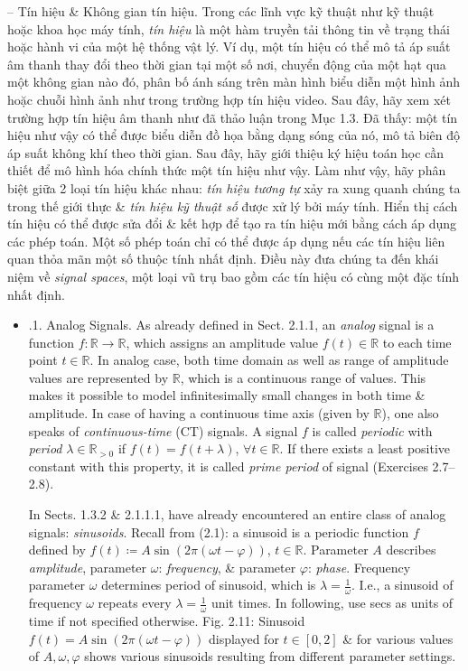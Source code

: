 \documentclass{article}
\begin{document}
\begin{itemize}
\begin{itemize}
		-- {\sf Tín hiệu \& Không gian tín hiệu.} Trong các lĩnh vực kỹ thuật như kỹ thuật hoặc khoa học máy tính, {\it tín hiệu} là một hàm truyền tải thông tin về trạng thái hoặc hành vi của một hệ thống vật lý. Ví dụ, một tín hiệu có thể mô tả áp suất âm thanh thay đổi theo thời gian tại một số nơi, chuyển động của một hạt qua một không gian nào đó, phân bố ánh sáng trên màn hình biểu diễn một hình ảnh hoặc chuỗi hình ảnh như trong trường hợp tín hiệu video. Sau đây, hãy xem xét trường hợp tín hiệu âm thanh như đã thảo luận trong Mục 1.3. Đã thấy: một tín hiệu như vậy có thể được biểu diễn đồ họa bằng dạng sóng của nó, mô tả biên độ áp suất không khí theo thời gian. Sau đây, hãy giới thiệu ký hiệu toán học cần thiết để mô hình hóa chính thức một tín hiệu như vậy. Làm như vậy, hãy phân biệt giữa 2 loại tín hiệu khác nhau: {\it tín hiệu tương tự} xảy ra xung quanh chúng ta trong thế giới thực \& {\it tín hiệu kỹ thuật số} được xử lý bởi máy tính. Hiển thị cách tín hiệu có thể được sửa đổi \& kết hợp để tạo ra tín hiệu mới bằng cách áp dụng các phép toán. Một số phép toán chỉ có thể được áp dụng nếu các tín hiệu liên quan thỏa mãn một số thuộc tính nhất định. Điều này đưa chúng ta đến khái niệm về {\it signal spaces}, một loại vũ trụ bao gồm các tín hiệu có cùng một đặc tính nhất định.
		\begin{itemize}
			\item {.1. Analog Signals.} As already defined in Sect. 2.1.1, an {\it analog} signal is a function $f:\mathbb{R}\to\mathbb{R}$, which assigns an amplitude value $f(t)\in\mathbb{R}$ to each time point $t\in\mathbb{R}$. In analog case, both time domain as well as range of amplitude values are represented by $\mathbb{R}$, which is a continuous range of values. This makes it possible to model infinitesimally small changes in both time \& amplitude. In case of having a continuous time axis (given by $\mathbb{R}$), one also speaks of {\it continuous-time} (CT) signals. A signal $f$ is called {\it periodic} with {\it period} $\lambda\in\mathbb{R}_{> 0}$ if $f(t) = f(t + \lambda)$, $\forall t\in\mathbb{R}$. If there exists a least positive constant with this property, it is called {\it prime period} of signal (Exercises 2.7--2.8).
			
			In Sects. 1.3.2 \& 2.1.1.1, have already encountered an entire class of analog signals: {\it sinusoids}. Recall from (2.1): a sinusoid is a periodic function $f$ defined by $f(t)\coloneqq A\sin(2\pi(\omega t - \varphi))$, $t\in\mathbb{R}$. Parameter $A$ describes {\it amplitude}, parameter $\omega$: {\it frequency}, \& parameter $\varphi$: {\it phase}. Frequency parameter $\omega$ determines period of sinusoid, which is $\lambda = \frac{1}{\omega}$. I.e., a sinusoid of frequency $\omega$ repeats every $\lambda = \frac{1}{\omega}$ unit times. In following, use secs as units of time if not specified otherwise. {\sf Fig. 2.11: Sinusoid $f(t) = A\sin(2\pi(\omega t - \varphi))$ displayed for $t\in[0,2]$ \& for various values of $A,\omega,\varphi$} shows various sinusoids resulting from different parameter settings.
			

\end{itemize}
\end{itemize}
\end{itemize}
\end{document}
